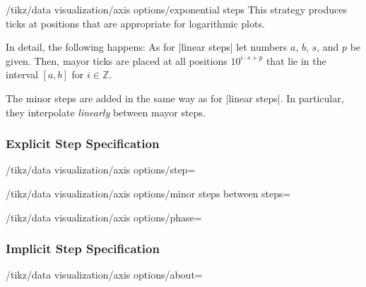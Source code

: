 \begin{key}{/tikz/data visualization/axis options/exponential steps}
  This strategy produces ticks at positions that are appropriate for
  logarithmic plots.

  In detail, the following happens: As for |linear steps| let numbers
  $a$, $b$, $s$, and $p$ be given. Then, mayor ticks are placed at all
  positions $10^{i\cdot s+p}$ that lie in the interval $[a,b]$ for $i
  \in \mathbb Z$.

  The minor steps are added in the same way as for |linear steps|. In
  particular, they interpolate \emph{linearly} between mayor steps.
  
\begin{codeexample}[]
\end{codeexample}  
\end{key}




\subsubsection{Explicit Step Specification}

\begin{key}{/tikz/data visualization/axis options/step=}
\end{key}

\begin{key}{/tikz/data visualization/axis options/minor steps between steps=}
\end{key}

\begin{key}{/tikz/data visualization/axis options/phase=}
\end{key}

  
\subsubsection{Implicit Step Specification}

\begin{key}{/tikz/data visualization/axis options/about=}
\end{key}

